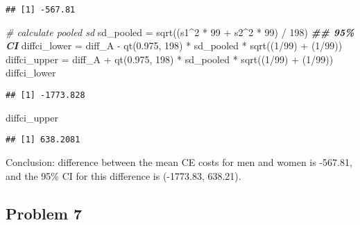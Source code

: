 \documentclass[
]{article}
\newenvironment{Shaded}{\begin{snugshade}}{\end{snugshade}}
\newcommand{\CommentTok}[1]{\textcolor[rgb]{0.56,0.35,0.01}{\textit{#1}}}
\newcommand{\DecValTok}[1]{\textcolor[rgb]{0.00,0.00,0.81}{#1}}
\newcommand{\DocumentationTok}[1]{\textcolor[rgb]{0.56,0.35,0.01}{\textbf{\textit{#1}}}}
\newcommand{\FloatTok}[1]{\textcolor[rgb]{0.00,0.00,0.81}{#1}}
\newcommand{\FunctionTok}[1]{\textcolor[rgb]{0.00,0.00,0.00}{#1}}
\newcommand{\NormalTok}[1]{#1}
\newcommand{\OtherTok}[1]{\textcolor[rgb]{0.56,0.35,0.01}{#1}}
\newcommand{\SpecialCharTok}[1]{\textcolor[rgb]{0.00,0.00,0.00}{#1}}
\begin{document}
\begin{verbatim}
## [1] -567.81
\end{verbatim}

\begin{Shaded}
\begin{Highlighting}[]
\CommentTok{\# calculate pooled sd}
\NormalTok{sd\_pooled }\OtherTok{=} \FunctionTok{sqrt}\NormalTok{((s1}\SpecialCharTok{\^{}}\DecValTok{2} \SpecialCharTok{*} \DecValTok{99} \SpecialCharTok{+}\NormalTok{ s2}\SpecialCharTok{\^{}}\DecValTok{2} \SpecialCharTok{*} \DecValTok{99}\NormalTok{) }\SpecialCharTok{/} \DecValTok{198}\NormalTok{)}
\DocumentationTok{\#\# 95\% CI}
\NormalTok{diffci\_lower }\OtherTok{=}\NormalTok{ diff\_A }\SpecialCharTok{{-}} \FunctionTok{qt}\NormalTok{(}\FloatTok{0.975}\NormalTok{, }\DecValTok{198}\NormalTok{) }\SpecialCharTok{*}\NormalTok{ sd\_pooled }\SpecialCharTok{*} \FunctionTok{sqrt}\NormalTok{((}\DecValTok{1}\SpecialCharTok{/}\DecValTok{99}\NormalTok{) }\SpecialCharTok{+}\NormalTok{ (}\DecValTok{1}\SpecialCharTok{/}\DecValTok{99}\NormalTok{))}
\NormalTok{diffci\_upper }\OtherTok{=}\NormalTok{ diff\_A }\SpecialCharTok{+} \FunctionTok{qt}\NormalTok{(}\FloatTok{0.975}\NormalTok{, }\DecValTok{198}\NormalTok{) }\SpecialCharTok{*}\NormalTok{ sd\_pooled }\SpecialCharTok{*} \FunctionTok{sqrt}\NormalTok{((}\DecValTok{1}\SpecialCharTok{/}\DecValTok{99}\NormalTok{) }\SpecialCharTok{+}\NormalTok{ (}\DecValTok{1}\SpecialCharTok{/}\DecValTok{99}\NormalTok{))}
\NormalTok{diffci\_lower}
\end{Highlighting}
\end{Shaded}

\begin{verbatim}
## [1] -1773.828
\end{verbatim}

\begin{Shaded}
\begin{Highlighting}[]
\NormalTok{diffci\_upper}
\end{Highlighting}
\end{Shaded}

\begin{verbatim}
## [1] 638.2081
\end{verbatim}

Conclusion: difference between the mean CE costs for men and women is
-567.81, and the 95\% CI for this difference is (-1773.83, 638.21).

\hypertarget{problem-7}{%
\subsection{Problem 7}\label{problem-7}}
\end{document}

